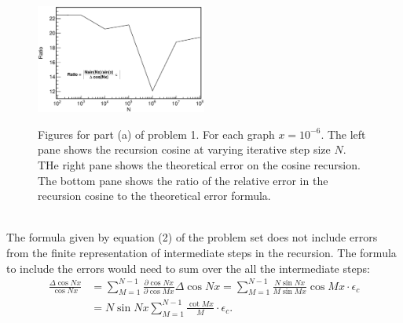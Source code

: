 \documentclass[singlepage,notitlepage,nofootinbib,11pt]{revtex4-1}
\begin{document}
\begin{figure}[h]
  \centering
{}
\\
  \includegraphics[width=0.5\textwidth]{figures/1a_ratio.eps}
  \hfill
  \caption{Figures for part (a) of problem 1. For each graph $x = 10^{-6}$. The left pane shows the recursion cosine at varying iterative step size $N$. THe right pane shows the theoretical error on the cosine recursion. The bottom pane shows the ratio of the relative error in the recursion cosine to the theoretical error formula.}
\end{figure}\\
\indent The formula given by equation (2) of the problem set does not include errors from the finite representation of intermediate steps in the recursion. The formula to include the errors would need to sum over the all the intermediate steps:
\begin{align*}
\frac{\Delta\cos Nx}{\cos Nx} &= \sum_{M=1}^{N-1}\frac{\partial \cos Nx}{\partial \cos Mx}\Delta\cos Nx = \sum_{M=1}^{N-1}\frac{N\sin Nx}{M\sin Mx}\cos Mx \cdot \epsilon_c\\
&= N\sin Nx\sum_{M=1}^{N-1}\frac{\cot Mx}{M} \cdot \epsilon_c.
\end{align*}
\end{document}
